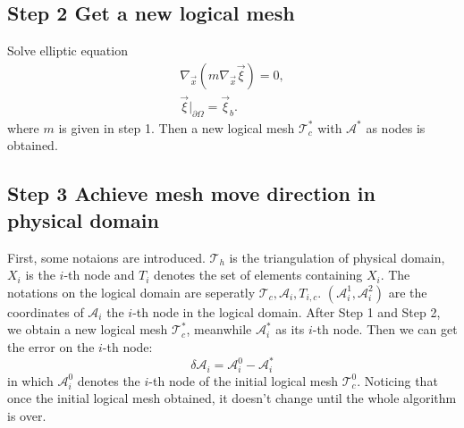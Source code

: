 \documentclass{eajam}
\begin{document}
   \subsection{Step 2 Get a new logical mesh}
      Solve elliptic equation 
      \begin{eqnarray}
        \nabla_{\vec{x}}(m \nabla_{\vec{x}} \vec{\xi}) = 0, \\
        \vec{\xi}|_{\partial \Omega} = \vec{\xi}_b.
        \label{eq::logical}
      \end{eqnarray}
      where $m$ is given in step 1. Then a new logical mesh
      $\mathcal{T}_c^*$ with $\mathcal{A}^*$ as nodes is obtained.

   \subsection{Step 3 Achieve mesh move direction in physical domain}
      First, some notaions are introduced. $\mathcal{T}_h$ is the
      triangulation of physical domain, $X_i$ is the $i$-th node and  
      $T_i$ denotes the set of elements containing $X_i$.
      The notations on the logical domain are seperatly
      $\mathcal{T}_c, \mathcal{A}_i, T_{i, c}$. $(\mathcal{A}_i^1,
      \mathcal{A}_i^2)$ are the coordinates of $\mathcal{A}_i$ the
      $i$-th node in the logical domain. After Step 1 and
      Step 2, we obtain a new logical mesh $\mathcal{T}_c^*$,
      meanwhile $\mathcal{A}_i^*$ as its $i$-th node. Then we can get
      the error on the $i$-th node:
      \begin{equation}
        \delta \mathcal{A}_i = \mathcal{A}_i^0 - \mathcal{A}_i^*
      \end{equation}
      in which  $\mathcal{A}_i^0$ denotes the $i$-th node of the
      initial logical mesh $\mathcal{T}_c^0$. Noticing that once the
      initial logical mesh obtained, it doesn't change until the whole
      algorithm is over.
      
\end{document}
